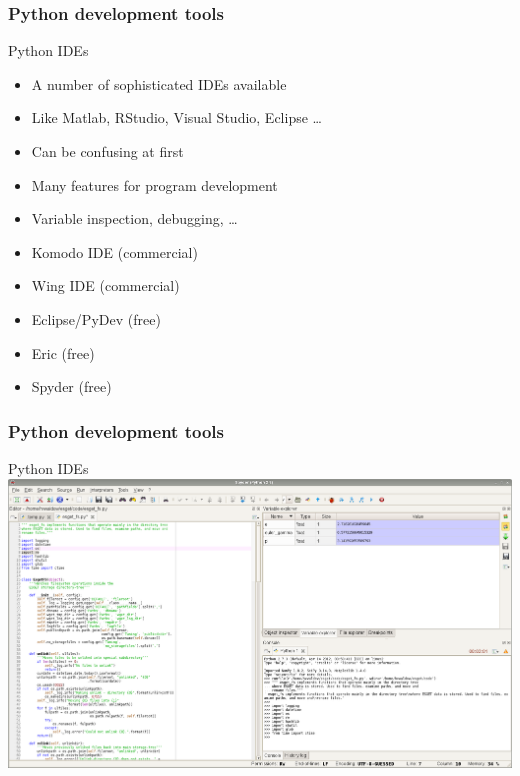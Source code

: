 \documentclass[xcolor=pdftex,dvipsnames,table]{beamer}
\begin{document}
\begin{frame}
  \frametitle{Python development tools}
  \begin{block}{Python IDEs}
        \begin{itemize}[<+->]
          \item A number of sophisticated IDEs available
          \item Like Matlab, RStudio, Visual Studio, Eclipse \ldots
          \item Can be confusing at first
          \item Many features for program development
          \item Variable inspection, debugging, \ldots
          \item Komodo IDE (commercial)
          \item Wing IDE  (commercial)
          \item Eclipse/PyDev (free)
          \item Eric (free)
          \item <+| alert@10>Spyder (free)
        \end{itemize}
  \end{block}
\end{frame}

\begin{frame}
  \frametitle{Python development tools}
  \begin{block}{Python IDEs}
    \includegraphics[width=\textwidth]{spyder.png}
  \end{block}
\end{frame}
\end{document}
